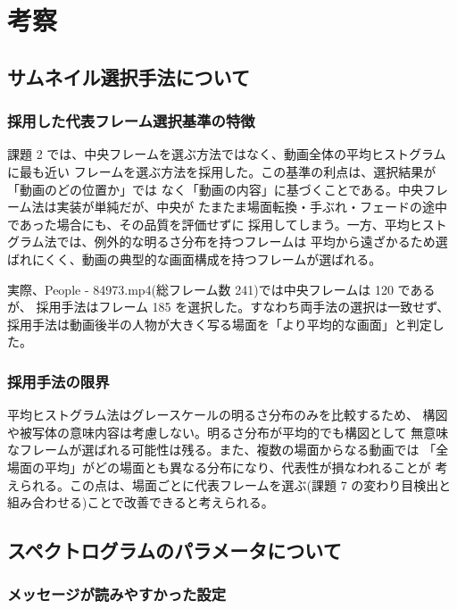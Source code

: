 \section{考察}

\subsection{サムネイル選択手法について}

\subsubsection{採用した代表フレーム選択基準の特徴}

課題 2 では、中央フレームを選ぶ方法ではなく、動画全体の平均ヒストグラムに最も近い
フレームを選ぶ方法を採用した。この基準の利点は、選択結果が「動画のどの位置か」では
なく「動画の内容」に基づくことである。中央フレーム法は実装が単純だが、中央が
たまたま場面転換・手ぶれ・フェードの途中であった場合にも、その品質を評価せずに
採用してしまう。一方、平均ヒストグラム法では、例外的な明るさ分布を持つフレームは
平均から遠ざかるため選ばれにくく、動画の典型的な画面構成を持つフレームが選ばれる。

実際、People - 84973.mp4(総フレーム数 241)では中央フレームは 120 であるが、
採用手法はフレーム 185 を選択した。すなわち両手法の選択は一致せず、
採用手法は動画後半の人物が大きく写る場面を「より平均的な画面」と判定した。

\subsubsection{採用手法の限界}

平均ヒストグラム法はグレースケールの明るさ分布のみを比較するため、
構図や被写体の意味内容は考慮しない。明るさ分布が平均的でも構図として
無意味なフレームが選ばれる可能性は残る。また、複数の場面からなる動画では
「全場面の平均」がどの場面とも異なる分布になり、代表性が損なわれることが
考えられる。この点は、場面ごとに代表フレームを選ぶ(課題 7 の変わり目検出と
組み合わせる)ことで改善できると考えられる。

\subsection{スペクトログラムのパラメータについて}

\subsubsection{メッセージが読みやすかった設定}

